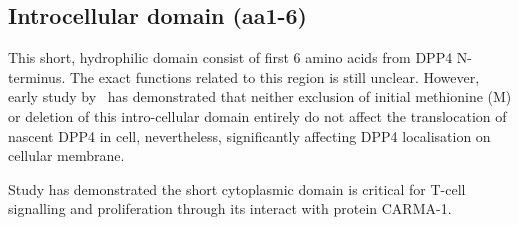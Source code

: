 \subsection{Introcellular domain (aa1-6)}

This short, hydrophilic domain consist of first 6 amino acids from DPP4 N-terminus. The exact functions related to this region is still unclear. However, early study by~\citet{Hong1990} has demonstrated that neither exclusion of initial methionine (M) or deletion of this intro-cellular domain entirely do not affect the translocation of nascent DPP4 in cell, nevertheless, significantly affecting DPP4 localisation on cellular membrane. 

Study has demonstrated the short cytoplasmic domain is critical for T-cell signalling and proliferation through its interact with protein CARMA-1. \cite{Ohnuma_2007}